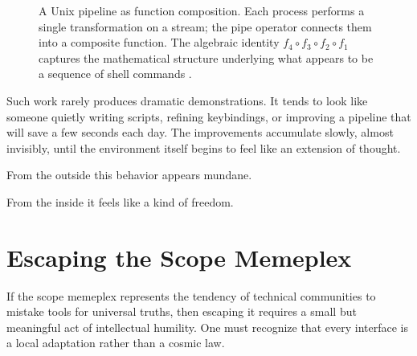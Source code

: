 \documentclass[11pt]{article}
\theoremstyle{definition}
\begin{document}
\begin{figure}[h]
\centering
{}
\caption{A Unix pipeline as function composition. Each process performs a
single transformation on a stream; the pipe operator connects them into
a composite function. The algebraic identity $f_4 \circ f_3 \circ f_2
\circ f_1$ captures the mathematical structure underlying what appears
to be a sequence of shell commands \cite{mcilroy1978,ritchie1974}.}
\label{fig:pipeline}
\end{figure}

Such work rarely produces dramatic demonstrations. It tends to look like
someone quietly writing scripts, refining keybindings, or improving a
pipeline that will save a few seconds each day. The improvements
accumulate slowly, almost invisibly, until the environment itself begins
to feel like an extension of thought.

From the outside this behavior appears mundane.

From the inside it feels like a kind of freedom.

\section{Escaping the Scope Memeplex}

If the scope memeplex represents the tendency of technical communities to
mistake tools for universal truths, then escaping it requires a small
but meaningful act of intellectual humility. One must recognize that
every interface is a local adaptation rather than a cosmic law.
\end{document}
